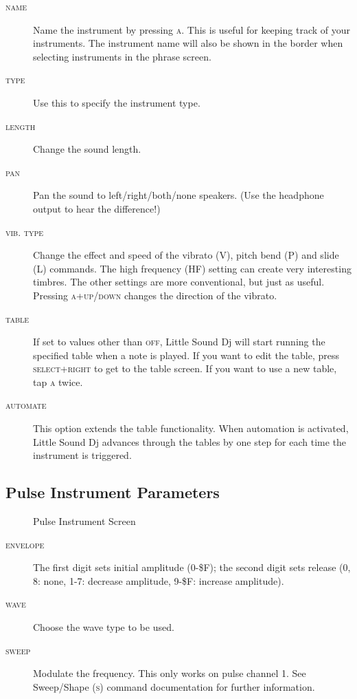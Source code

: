 \begin{description}
	\item[\textsc{name}] Name the instrument by pressing \textsc{a}. This is useful for keeping track of your instruments. The instrument name will also be shown in the border when selecting instruments in the phrase screen.
	\item[\textsc{type}] Use this to specify the instrument type.
	\item[\textsc{length}] Change the sound length.
	\item[\textsc{pan}] Pan the sound to left/right/both/none speakers. (Use the headphone output to hear the difference!)
	\item[\textsc{vib. type}] Change the effect and speed of the vibrato (V), pitch bend (P) and slide (L) commands. The high frequency (HF) setting can create very interesting timbres. The other settings are more conventional, but just as useful. Pressing \textsc{a+up/down} changes the direction of the vibrato.
	\item[\textsc{table}] If set to values other than \textsc{off}, Little Sound Dj will start running the specified table when a note is played. If you want to edit the table, press \textsc{select+right} to get to the table screen. If you want to use a new table, tap \textsc{a} twice.
	\item[\textsc{automate}] This option extends the table functionality. When automation is activated, Little Sound Dj advances through the tables by one step for each time the instrument is triggered.
\end{description}

\subsection{Pulse Instrument Parameters}

\begin{figure}[htpb]
	\begin{center}
	\end{center}
	\caption{Pulse Instrument Screen}
	\label{fig:instr-pulse}
\end{figure}

\begin{description}
	\item[\textsc{envelope}] The first digit sets initial amplitude (0-\$F); the second digit sets release (0, 8: none, 1-7: decrease amplitude, 9-\$F: increase amplitude).
	\item[\textsc{wave}] Choose the wave type to be used.
	\item[\textsc{sweep}] Modulate the frequency. This only works on pulse channel 1. See Sweep/Shape (\textsc{s}) command documentation for further information.
\end{description}

